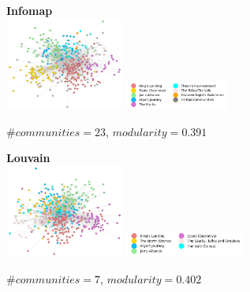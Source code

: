 \documentclass[10pt,twocolumn,letterpaper]{article}
\begin{document}
\begin{figure}[!h]
    \centering
    \textbf{Infomap}  \\
    \includegraphics[width=0.35\textwidth]{img/all_seasons/communities_infomap.jpg}
    \includegraphics[width=0.3\textwidth]{img/all_seasons/infomap_legend.jpg}\\
    \caption{\small{$\#communities=23$, $modularity=0.391$}}
    \label{fig:infomap_all}
    \vspace{2cm}
\end{figure}

\begin{figure}[!h]
    \centering
    \textbf{Louvain} \\
    \includegraphics[width=0.35\textwidth]{img/all_seasons/communities_louvain.jpg}
    \includegraphics[width=0.35\textwidth]{img/all_seasons/louvain_legend.jpg}\\
    \caption{\small{$\#communities=7$, $modularity=0.402$}}
    \label{fig:louvain_all}
    \vspace{1.5cm}
\end{figure}
\end{document}
